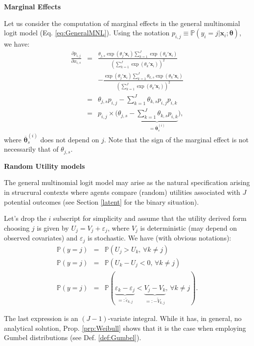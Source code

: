 \documentclass[
  12pt,
]{book}
\theoremstyle{definition}
\theoremstyle{definition}
\theoremstyle{definition}
\theoremstyle{definition}
\theoremstyle{remark}
\begin{document}
\textbf{Marginal Effects}

Let us consider the computation of marginal effects in the general multinomial logit model (Eq. \eqref{eq:GeneralMNL}). Using the notation \(p_{i,j} \equiv \mathbb{P}(y_i=j|\mathbf{x}_i;\boldsymbol\theta)\), we have:
\begin{eqnarray*}
\frac{\partial p_{i,j}}{\partial x_{i,s}} &=& \frac{\theta_{j,s}\exp(\theta_j'\mathbf{x}_i)\sum_{k=1}^J \exp(\theta_k'\mathbf{x}_i)}{(\sum_{k=1}^J \exp(\theta_k'\mathbf{x}_i))^2} \\
&& - \frac{\exp(\theta_j'\mathbf{x}_i)\sum_{k=1}^J \theta_{k,s} \exp(\theta_k'\mathbf{x}_i)}{(\sum_{k=1}^J \exp(\theta_k'\mathbf{x}_i))^2}\\
&=& \theta_{j,s} p_{i,j} - \sum_{k=1}^J \theta_{k,s} p_{i,j}p_{i,k}\\
&=&  p_{i,j} \times \Big(\theta_{j,s} - \underbrace{\sum_{k=1}^J \theta_{k,s} p_{i,k}}_{=\overline{\boldsymbol{\theta}}^{(i)}_{s}}\Big),
\end{eqnarray*}
where \(\overline{\boldsymbol\theta}^{(i)}_{s}\) does not depend on \(j\). Note that the sign of the marginal effect is not necessarily that of \(\theta_{j,s}\).

\textbf{Random Utility models}

The general multinomial logit model may arise as the natural specification arising in strucrural contexts where agents compare (random) utilities associated with \(J\) potential outcomes (see Section \ref{latent} for the binary situation).

Let's drop the \(i\) subscript for simplicity and assume that the utility derived form choosing \(j\) is given by \(U_j = V_j + \varepsilon_j\), where \(V_j\) is deterministic (may depend on observed covariates) and \(\varepsilon_j\) is stochastic. We have (with obvious notations):
\begin{eqnarray*}
\mathbb{P}(y=j) &=& \mathbb{P}(U_j>U_k,\,\forall k \ne j)\\
\mathbb{P}(y=j) &=& \mathbb{P}(U_k-U_j<0,\,\forall k \ne j)\\
\mathbb{P}(y=j) &=& \mathbb{P}(\underbrace{\varepsilon_k-\varepsilon_j}_{=:\tilde\varepsilon_{k,j}}<\underbrace{V_j - V_k}_{=:-\tilde{V}_{k,j}},\,\forall k \ne j).
\end{eqnarray*}

The last expression is an \((J-1)\)-variate integral. While it has, in general, no analytical solution, Prop. \ref{prp:Weibull} shows that it is the case when employing Gumbel distributions (see Def. \ref{def:Gumbel}).
\end{document}
